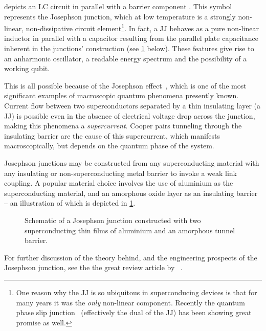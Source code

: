 depicts an LC circuit in parallel with a barrier component  \resizebox{!}{0.6em}{}.
This symbol represents the Josephson junction, which at low temperature is a strongly non-linear, non-dissipative circuit element\footnote{One reason why the JJ is so ubiquitous in superconducing devices is that for many years it was the \textit{only} non-linear component. Recently the quantum phase slip junction~\cite{Bezryadin2000,Mooij2006,Astafiev2012} (effectively the dual of the JJ) has been showing great promise as well.}.
In fact, a JJ behaves as a pure non-linear inductor in parallel with a capacitor resulting from the parallel plate capacitance inherent in the junctions' construction (see \cref{fig:jjdiagram} below).
These features give rise to an anharmonic oscillator, a readable energy spectrum and the possibility of a working qubit.

This is all possible because of the Josephson effect~\cite{Josephson1962,Josephson1965}, which is one of the most significant examples of macroscopic quantum phenomena presently known.
Current flow between two superconductors separated by a thin insulating layer (\ie a JJ) is possible even in the absence of electrical voltage drop across the junction, making this phenomena a \textit{supercurrent}.
Cooper pairs tunneling through the insulating barrier are the cause of this supercurrent, which manifests macroscopically, but depends on the quantum phase of the system.

Josephson junctions may be constructed from any superconducting material with any insulating or non-superconducting metal barrier to invoke a weak link coupling.
A popular material choice involves the use of aluminium as the superconducting material, and an amorphous oxide layer as an insulating barrier -- an illustration of which is depicted in \cref{fig:jjdiagram}.

\begin{figure}[htp]
\resizebox{0.75\textwidth}{!}{}
\caption[Josephson Junction Schematic]{\label{fig:jjdiagram}Schematic of a Josephson junction constructed with two superconducting thin films of aluminium and an amorphous  tunnel barrier.}
\end{figure}

For further discussion of the theory behind, and the engineering prospects of the Josephson junction, see the the great review article by \citeauthor{Makhlin2001}~\cite{Makhlin2001}.

